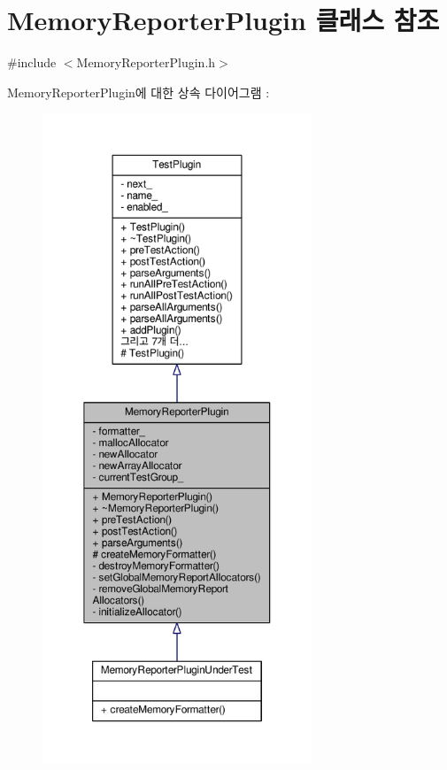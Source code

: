 \hypertarget{class_memory_reporter_plugin}{}\section{Memory\+Reporter\+Plugin 클래스 참조}
\label{class_memory_reporter_plugin}


{\ttfamily \#include $<$Memory\+Reporter\+Plugin.\+h$>$}



Memory\+Reporter\+Plugin에 대한 상속 다이어그램 \+: 
\nopagebreak
\begin{figure}[H]
\begin{center}
\leavevmode
\includegraphics[height=550pt]{class_memory_reporter_plugin__inherit__graph}
\end{center}
\end{figure}


